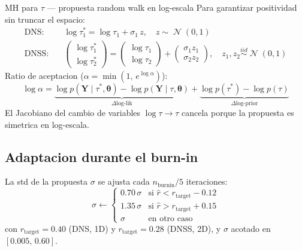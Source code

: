 \documentclass[12pt, a4paper]{article}
\theoremstyle{plain}
\theoremstyle{definition}
\theoremstyle{remark}
\newcommand{\bY}{\mathbf{Y}}
\DeclareMathOperator{\N}{\mathcal{N}}
\begin{document}
\begin{teoremabox}{MH para $\tau$ --- propuesta random walk en log-escala}
Para garantizar positividad sin truncar el espacio:
\begin{align}
  \text{DNS:}  &\quad \log\tau_1^* = \log\tau_1 + \sigma_1\,z,
                \quad z \sim \N(0,1) \\
  \text{DNSS:} &\quad \begin{pmatrix}\log\tau_1^*\\\log\tau_2^*\end{pmatrix}
                = \begin{pmatrix}\log\tau_1\\\log\tau_2\end{pmatrix}
                + \begin{pmatrix}\sigma_1 z_1\\\sigma_2 z_2\end{pmatrix},
                \quad z_1,z_2 \overset{iid}{\sim} \N(0,1)
\end{align}
Ratio de aceptacion ($\alpha = \min(1,\,e^{\log\alpha})$):
\begin{equation}
  \log\alpha =
  \underbrace{
    \log p(\bY \mid \tau^*, \bm{\theta}) - \log p(\bY \mid \tau, \bm{\theta})
  }_{\Delta\text{log-lik}}
  +
  \underbrace{
    \log p(\tau^*) - \log p(\tau)
  }_{\Delta\text{log-prior}}
  \label{eq:mh_ratio}
\end{equation}
El Jacobiano del cambio de variables $\log\tau \to \tau$ cancela porque la
propuesta es simetrica en log-escala.
\end{teoremabox}

\subsection{Adaptacion durante el burn-in}

La std de la propuesta $\sigma$ se ajusta cada $n_\text{burnin}/5$ iteraciones:
\begin{equation}
  \sigma \leftarrow
  \begin{cases}
    0.70\,\sigma & \text{si } \hat{r} < r_\text{target} - 0.12 \\
    1.35\,\sigma & \text{si } \hat{r} > r_\text{target} + 0.15 \\
    \sigma       & \text{en otro caso}
  \end{cases}
  \label{eq:adapt}
\end{equation}
con $r_\text{target} = 0.40$ (DNS, 1D) y $r_\text{target} = 0.28$ (DNSS, 2D),
y $\sigma$ acotado en $[0.005,\, 0.60]$.
\end{document}
